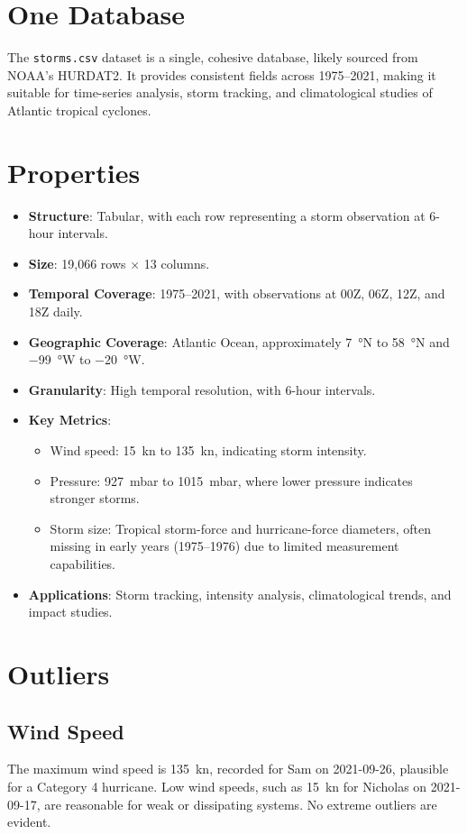\section{One Database}
The \texttt{storms.csv} dataset is a single, cohesive database, likely sourced from NOAA’s HURDAT2. It provides consistent fields across 1975--2021, making it suitable for time-series analysis, storm tracking, and climatological studies of Atlantic tropical cyclones.

\section{Properties}
\begin{itemize}
	\item \textbf{Structure}: Tabular, with each row representing a storm observation at 6-hour intervals.
	\item \textbf{Size}: 19,066 rows $\times$ 13 columns.
	\item \textbf{Temporal Coverage}: 1975--2021, with observations at 00Z, 06Z, 12Z, and 18Z daily.
	\item \textbf{Geographic Coverage}: Atlantic Ocean, approximately \SI{7}{\degree}N to \SI{58}{\degree}N and \SI{-99}{\degree}W to \SI{-20}{\degree}W.
	\item \textbf{Granularity}: High temporal resolution, with 6-hour intervals.
	\item \textbf{Key Metrics}:
	\begin{itemize}
		\item Wind speed: \SI{15}{\knot} to \SI{135}{\knot}, indicating storm intensity.
		\item Pressure: \SI{927}{\milli\bar} to \SI{1015}{\milli\bar}, where lower pressure indicates stronger storms.
		\item Storm size: Tropical storm-force and hurricane-force diameters, often missing in early years (1975--1976) due to limited measurement capabilities.
	\end{itemize}
	\item \textbf{Applications}: Storm tracking, intensity analysis, climatological trends, and impact studies.
\end{itemize}

\section{Outliers}
\subsection{Wind Speed}
The maximum wind speed is \SI{135}{\knot}, recorded for Sam on 2021-09-26, plausible for a Category 4 hurricane. Low wind speeds, such as \SI{15}{\knot} for Nicholas on 2021-09-17, are reasonable for weak or dissipating systems. No extreme outliers are evident.

